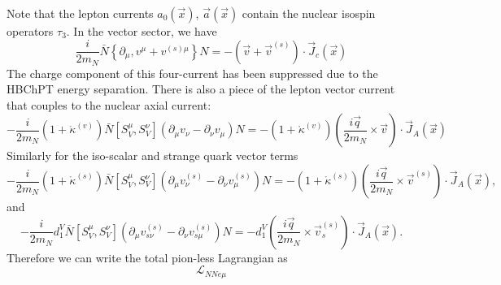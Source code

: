 \documentclass{book}[12pt]
\begin{document}
Note that the lepton currents $a_0(\vec{x})$, $\vec{a}(\vec{x})$ contain the nuclear isospin operators $\tau_3$.
In the vector sector, we have
\begin{equation}
\frac{i}{2m_N}\bar{N}\left\{\partial_{\mu},v^{\mu}+v^{(s)\mu}\right\}N=-\left(\vec{v}+\vec{v}^{(s)}\right)\cdot\vec{J}_c(\vec{x})
\end{equation}
The charge component of this four-current has been suppressed due to the HBChPT energy separation. There is also a piece of the lepton vector current that couples to the nuclear axial current:
\begin{equation}
-\frac{i}{2m_N}\left(1+\mathring{\kappa}^{(v)}\right)\bar{N}\left[S_V^{\mu},S_V^{\nu}\right]\left(\partial_{\mu}v_{\nu}-\partial_{\nu}v_{\mu}\right)N=-\left(1+\mathring{\kappa}^{(v)}\right)\left(\frac{i\vec{q}}{2m_N}\times\vec{v}\right)\cdot \vec{J}_A(\vec{x})
\end{equation}
Similarly for the iso-scalar and strange quark vector terms
\begin{equation}
-\frac{i}{2m_N}\left(1+\mathring{\kappa}^{(s)}\right)\bar{N}\left[S_V^{\mu},S_V^{\nu}\right]\left(\partial_{\mu}v_{\nu}^{(s)}-\partial_{\nu}v_{\mu}^{(s)}\right)N=-\left(1+\mathring{\kappa}^{(s)}\right)\left(\frac{i\vec{q}}{2m_N}\times\vec{v}^{(s)}\right)\cdot \vec{J}_A(\vec{x}),
\end{equation}
and
\begin{equation}
-\frac{i}{2m_N}d_1^V\bar{N}\left[S_V^{\mu},S_V^{\nu}\right]\left(\partial_{\mu}v_{s\nu}^{(s)}-\partial_{\nu}v_{s\mu}^{(s)}\right)N=-d_1^V\left(\frac{i\vec{q}}{2m_N}\times\vec{v}_s^{(s)}\right)\cdot \vec{J}_A(\vec{x}).
\end{equation}
Therefore we can write the total pion-less Lagrangian as
\begin{equation}
\mathcal{L}_{NNe\mu}
\end{equation}
\end{document}
